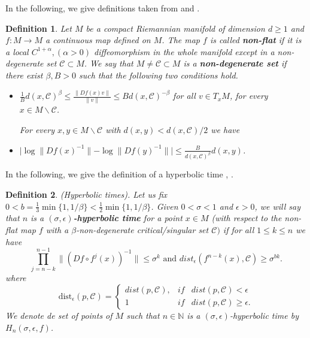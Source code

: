 \documentclass[12pt,a4paper]{amsart}
\theoremstyle{plain}
\newtheorem{definition}{Definition}[subsection]
\begin{document}
In the following, we give definitions taken from \cite{A} and \cite{Pi1}.

\begin{definition}
	Let $M$ be a compact Riemannian manifold of dimension $d \geq 1$ and $f:M \to M$ a continuous map defined on $M$.
	The map $f$ is called \textbf{\textit{non-flat}} if it is a local $C^{1 + \alpha}, (\alpha >0)$ diffeomorphism in the whole manifold except in a 
	non-degenerate set $\mathcal{C} \subset M$. We say that $M \neq \mathcal{C} \subset M$ is a \textbf{\textit{non-degenerate set}}
	if there exist $\beta, B > 0$ such that the following two conditions hold.
	
	\begin{itemize}
		\item $\frac{1}{B} d(x,\mathcal{C})^{\beta} \leq \frac{\parallel Df(x) v\parallel}{\parallel v \parallel} \leq B d(x,\mathcal{C})^{-\beta}$ for all $v \in T_{x}M$, for every $x \in M\backslash\mathcal{C}$.
		
		For every $x, y \in M \backslash \mathcal{C}$ with $d(x,y) < d(x,\mathcal{C})/2$ we have
		
		\item $\mid \log \parallel Df(x)^{-1} \parallel - \log \parallel Df(y)^{-1} \parallel \mid \leq \frac{B}{d(x,\mathcal{C})^{\beta}} d(x,y)$.
	\end{itemize}
	
\end{definition}

In the following, we give the definition of a hyperbolic time \cite{ALP2}, \cite{Pi1}.

\begin{definition}
	(Hyperbolic times). Let us fix $0 < b = \frac{1}{3} \min\{1,1 \slash \beta\} < \frac{1}{2} \min\{1,1\slash \beta\}$. 
	Given $0 < \sigma < 1$ and $\epsilon > 0$, we will say that $n$ is a $(\sigma, \epsilon)$\textbf{\textit{-hyperbolic time}} for a point $x \in M$ 
	(with respect to the non-flat map $f$ with a $\beta$-non-degenerate critical/singular set $\mathcal{C})$ if for all $1 \leq k \leq n$ we have 
	\[
	\prod_{j=n-k}^{n-1} \|(Df \circ f^{j}(x))^{-1}\| \leq \sigma^{k} \,\, \text{and} \,\, dist_{\epsilon}(f^{n-k}(x), \mathcal{C}) \geq \sigma^{bk}.
	\]
	where
	\[
	\text{dist}_{\epsilon}(p,\mathcal{C}) =  
	\left\{ 
	\begin{array}{ccc}
		dist(p,\mathcal{C}), & if & dist(p,\mathcal{C}) < \epsilon\\
		1 & if & dist(p,\mathcal{C}) \geq \epsilon. 
	\end{array}
	\right.
	\]
	We denote de set of points of $M$ such that $n \in \mathbb{N}$ is a $(\sigma,\epsilon)$-hyperbolic time by $H_{n}(\sigma,\epsilon,f)$.
\end{definition}
\end{document}
